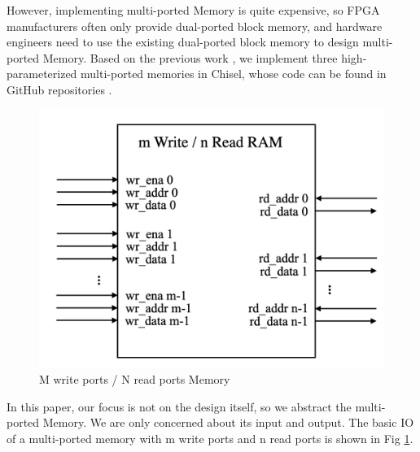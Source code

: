 \documentclass[conference]{IEEEtran}
\theoremstyle{definition}
\begin{document}
However, implementing multi-ported Memory is quite expensive, so FPGA manufacturers often only provide dual-ported block memory, and hardware engineers need to use the existing dual-ported block memory to design multi-ported Memory. 
Based on the previous work \cite{xiang2022parameterized}, we implement three high-parameterized multi-ported memories in Chisel, whose code can be found in GitHub repositories \cite{mpMemory}.

\begin{figure}[!htbp]
    \begin{center}
    \includegraphics[width=0.9\linewidth]{pics/mpmemoryio.png}
    \caption{M write ports / N read ports Memory}
    \label{fig: mpmemoryio}
    \end{center}
\end{figure}

In this paper, our focus is not on the design itself, so we abstract the multi-ported Memory.
We are only concerned about its input and output. The basic IO of a multi-ported memory with m write ports and n read ports is shown in Fig \ref{fig: mpmemoryio}.
\end{document}
